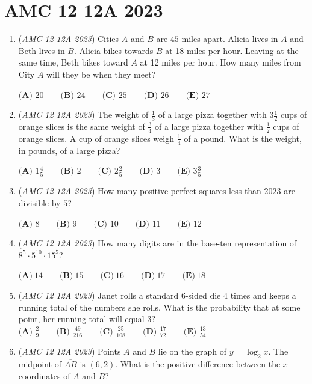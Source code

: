\section{AMC 12 12A 2023}
        \begin{enumerate}
        	\item (\textit{AMC 12 12A 2023}) Cities $A$ and $B$ are $45$ miles apart. Alicia lives in $A$ and Beth lives in $B$. Alicia bikes towards $B$ at 18 miles per hour. Leaving at the same time, Beth bikes toward $A$ at 12 miles per hour. How many miles from City $A$ will they be when they meet?


 $\textbf{(A) }20\qquad\textbf{(B) }24\qquad\textbf{(C) }25\qquad\textbf{(D) }26\qquad\textbf{(E) }27$


	\item (\textit{AMC 12 12A 2023}) The weight of $\frac{1}{3}$ of a large pizza together with $3 \frac{1}{2}$ cups of orange slices is the same weight of $\frac{3}{4}$ of a large pizza together with $\frac{1}{2}$ cups of orange slices. A cup of orange slices weigh $\frac{1}{4}$ of a pound. What is the weight, in pounds, of a large pizza?


 $\textbf{(A) }1\frac{4}{5}\qquad\textbf{(B) }2\qquad\textbf{(C) }2\frac{2}{5}\qquad\textbf{(D) }3\qquad\textbf{(E) }3\frac{3}{5}$


	\item (\textit{AMC 12 12A 2023}) How many positive perfect squares less than $2023$ are divisible by $5$?


 $\textbf{(A) }8\qquad\textbf{(B) }9\qquad\textbf{(C) }10\qquad\textbf{(D) }11\qquad\textbf{(E) }12$


	\item (\textit{AMC 12 12A 2023}) How many digits are in the base-ten representation of $8^5 \cdot 5^{10} \cdot 15^5$?


 $\textbf{(A)}~14\qquad\textbf{(B)}~15\qquad\textbf{(C)}~16\qquad\textbf{(D)}~17\qquad\textbf{(E)}~18\qquad$


	\item (\textit{AMC 12 12A 2023}) Janet rolls a standard $6$-sided die $4$ times and keeps a running total of the numbers she rolls. What is the probability that at some point, her running total will equal $3?$
$\textbf{(A) }\frac{2}{9}\qquad\textbf{(B) }\frac{49}{216}\qquad\textbf{(C) }\frac{25}{108}\qquad\textbf{(D) }\frac{17}{72}\qquad\textbf{(E) }\frac{13}{54}$


	\item (\textit{AMC 12 12A 2023}) Points $A$ and $B$ lie on the graph of $y=\log_{2}x$. The midpoint of $\overline{AB}$ is $(6, 2)$. What is the positive difference between the $x$-coordinates of $A$ and $B$?



\end{enumerate}
